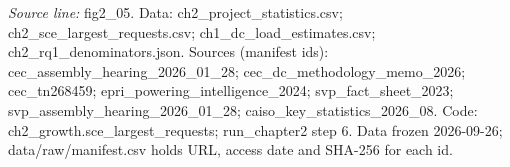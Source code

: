 {\scriptsize\textit{Source line:} fig2\_\allowbreak{}05. Data: ch2\_\allowbreak{}project\_\allowbreak{}statistics.csv; ch2\_\allowbreak{}sce\_\allowbreak{}largest\_\allowbreak{}requests.csv; ch1\_\allowbreak{}dc\_\allowbreak{}load\_\allowbreak{}estimates.csv; ch2\_\allowbreak{}rq1\_\allowbreak{}denominators.json. Sources (manifest ids): cec\_\allowbreak{}assembly\_\allowbreak{}hearing\_\allowbreak{}2026\_\allowbreak{}01\_\allowbreak{}28; cec\_\allowbreak{}dc\_\allowbreak{}methodology\_\allowbreak{}memo\_\allowbreak{}2026; cec\_\allowbreak{}tn268459; epri\_\allowbreak{}powering\_\allowbreak{}intelligence\_\allowbreak{}2024; svp\_\allowbreak{}fact\_\allowbreak{}sheet\_\allowbreak{}2023; svp\_\allowbreak{}assembly\_\allowbreak{}hearing\_\allowbreak{}2026\_\allowbreak{}01\_\allowbreak{}28; caiso\_\allowbreak{}key\_\allowbreak{}statistics\_\allowbreak{}2026\_\allowbreak{}08. Code: ch2\_\allowbreak{}growth.sce\_\allowbreak{}largest\_\allowbreak{}requests; run\_\allowbreak{}chapter2 step 6. Data frozen 2026-09-26; data/raw/manifest.csv holds URL, access date and SHA-256 for each id.}